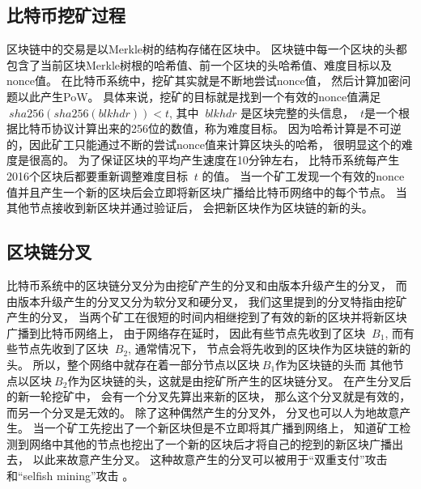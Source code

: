 \documentclass[a4paper, 11pt]{article}
\begin{document}
\begin{CJK*}{UTF8}{gbsn}
    
    \subsection{比特币挖矿过程}

    \indent

    区块链中的交易是以Merkle树\cite{ref_article2}的结构存储在区块中。
    区块链中每一个区块的头都包含了当前区块Merkle树根的哈希值、前一个区块的头哈希值、难度目标以及nonce值。
    在比特币系统中，挖矿其实就是不断地尝试nonce值，
    然后计算加密问题以此产生PoW。
    具体来说，挖矿的目标就是找到一个有效的nonce值满足$\ sha256(sha256(blkhdr)) < t $,
    其中 $\ blkhdr$ 是区块完整的头信息，
    $\ t$是一个根据比特币协议计算出来的256位的数值，称为难度目标。
    因为哈希计算是不可逆的，因此矿工只能通过不断的尝试nonce值来计算区块头的哈希，
    很明显这个的难度是很高的。
    为了保证区块的平均产生速度在10分钟左右，
    比特币系统每产生2016个区块后都要重新调整难度目标 $\ t$ 的值。
    当一个矿工发现一个有效的nonce值并且产生一个新的区块后会立即将新区块广播给比特币网络中的每个节点。
    当其他节点接收到新区块并通过验证后，
    会把新区块作为区块链的新的头。

    \subsection{区块链分叉}

    \indent

    比特币系统中的区块链分叉分为由挖矿产生的分叉\cite{ref_web3}和由版本升级产生的分叉\cite{ref_web4}，
    而由版本升级产生的分叉又分为软分叉和硬分叉，
    我们这里提到的分叉特指由挖矿产生的分叉，
    当两个矿工在很短的时间内相继挖到了有效的新的区块并将新区块广播到比特币网络上，
    由于网络存在延时，
    因此有些节点先收到了区块 $\ B_1$,
    而有些节点先收到了区块 $\ B_2$,
    通常情况下，
    节点会将先收到的区块作为区块链的新的头。
    所以，整个网络中就存在着一部分节点以区块$\ B_1$作为区块链的头而
    其他节点以区块$\ B_2$作为区块链的头，这就是由挖矿所产生的区块链分叉。
    在产生分叉后的新一轮挖矿中，
    会有一个分叉先算出来新的区块，
    那么这个分叉就是有效的，
    而另一个分叉是无效的。
    除了这种偶然产生的分叉外，
    分叉也可以人为地故意产生。
    当一个矿工先挖出了一个新区块但是不立即将其广播到网络上，
    知道矿工检测到网络中其他的节点也挖出了一个新的区块后才将自己的挖到的新区块广播出去，
    以此来故意产生分叉。
    这种故意产生的分叉可以被用于“双重支付”攻击\cite{ref_double_spending}和“selfish mining”攻击
    \cite{ref_selfish_mining1, ref_selfish_mining2, ref_selfish_mining3}。


\end{CJK*}
\end{document}
